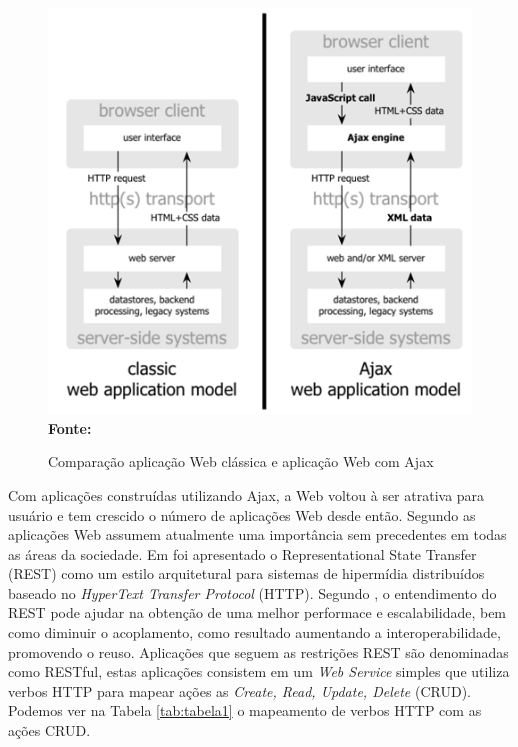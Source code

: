 \begin{figure}[!ht]
	\centering	
	\caption[\hspace{0.1cm}Comparação aplicação Web clássica e aplicação Web com Ajax.]{Comparação aplicação Web clássica e aplicação Web com Ajax}
	  \vspace{-0.4cm}
	\includegraphics[width=.8\textwidth]{figuras/ajax_comparison.png}
	 \vspace{-0.3cm}
	\\\textbf{\footnotesize Fonte: \cite{garrettAjax}}
	\label{fig:ajax_comparison}
\end{figure}


Com aplicações construídas utilizando Ajax, a Web voltou à ser atrativa para usuário e tem crescido o número de aplicações Web desde então. Segundo
\cite{tabulaRest} as aplicações Web assumem atualmente uma importância sem precedentes em todas as áreas da sociedade. Em \cite{fieldingRest} foi apresentado o Representational State Transfer (REST) 
como um estilo arquitetural para sistemas de hipermídia distribuídos baseado no \textit{HyperText Transfer Protocol} (HTTP). Segundo 
\cite{modelingRestful}, o entendimento do REST pode ajudar na obtenção de uma melhor performace e escalabilidade, bem como diminuir o acoplamento,
como resultado aumentando a interoperabilidade, promovendo o reuso. Aplicações que seguem as restrições REST são denominadas como RESTful, estas 
aplicações consistem em um \textit{Web Service} simples que utiliza verbos HTTP para mapear ações as \textit{Create, Read, Update, Delete} (CRUD). 
Podemos ver na Tabela \ref{tab:tabela1} o mapeamento de verbos HTTP com as ações CRUD.

